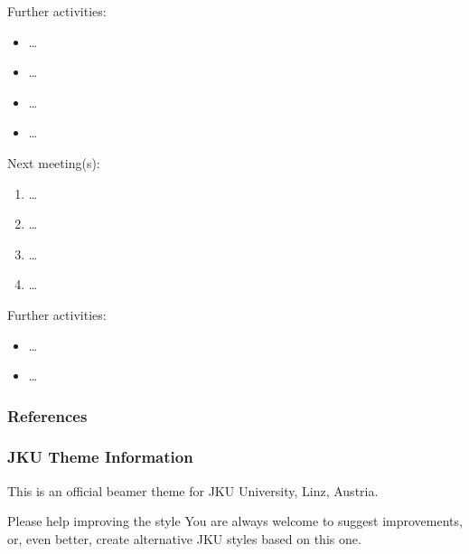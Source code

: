 \documentclass[aspectratio=169]{beamer}
\begin{document}
\begin{frame}
 Further activities:
 \begin{itemize}
  \item \ldots
  \item \ldots
  \item \ldots
  \item \ldots
 \end{itemize}
 Next meeting(s):
 \begin{enumerate}
  \item \ldots
  \item \ldots
  \item \ldots
  \item \ldots
 \end{enumerate}
 
\end{frame}

\begin{jkufinalwhite}
 Further activities:
 \begin{itemize}
  \item \ldots
  \item \ldots
 \end{itemize}
 
\end{jkufinalwhite}

\jkulogogrey
\jkulogowhite

\begin{frame}
\frametitle{References}


\end{frame}

\begin{frame}
\frametitle{JKU Theme Information}

This is an \alert{official} beamer theme for JKU University, Linz, Austria.

\vspace{1em}

\begin{alertblock}{Please help improving the style}
You are always welcome to suggest improvements, or, even better, create alternative JKU styles based on this one.
\end{alertblock}
\end{frame}
\end{document}
